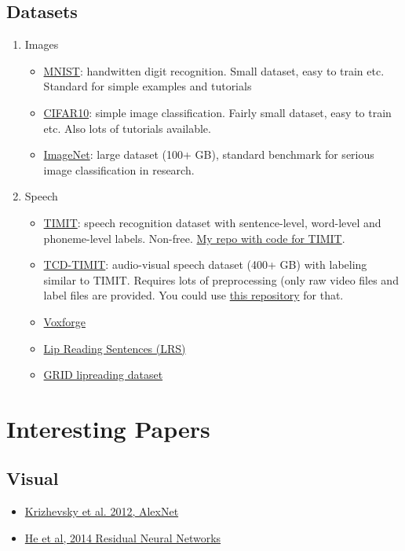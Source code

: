 \documentclass[]{article}
\begin{document}
\subsection{Datasets}
\begin{enumerate}
	\item{Images}
	\begin{itemize}
		\item \href{http://yann.lecun.com/exdb/mnist/}{MNIST}: handwitten digit recognition. Small dataset, easy to train etc. Standard for simple examples and tutorials
		\item \href{https://www.cs.toronto.edu/~kriz/cifar.html}{CIFAR10}: simple image classification. Fairly small dataset, easy to train etc. Also lots of tutorials available.
		\item \href{http://www.image-net.org/}{ImageNet}: large dataset (100+ GB), standard benchmark for serious image classification in research. 
	\end{itemize}
	\item{Speech}
	\begin{itemize}
		\item \href{https://catalog.ldc.upenn.edu/LDC93S1}{TIMIT}: speech recognition dataset with sentence-level, word-level and phoneme-level labels. Non-free. \href{https://github.com/matthijsvk/TIMITspeech}{My repo with code for TIMIT}.
		\item \href{https://sigmedia.tcd.ie/TCDTIMIT/}{TCD-TIMIT}: audio-visual speech dataset (400+ GB) with labeling similar to TIMIT. Requires lots of preprocessing (only raw video files and label files are provided. You could use \href{https://github.com/matthijsvk/TCDTIMITprocessing}{this repository} for that.
		\item \href{http://www.voxforge.org/}{Voxforge}
		\item \href{http://www.robots.ox.ac.uk/~vgg/data/lip_reading_sentences/}{Lip Reading Sentences (LRS)}
		\item \href{http://spandh.dcs.shef.ac.uk/gridcorpus/}{GRID lipreading dataset}
	\end{itemize}
\end{enumerate}

\pagebreak
\section{Interesting Papers}

\subsection{Visual}
\begin{itemize}
	\item \href{http://papers.nips.cc/paper/4824-imagenet-classification-with-deep-convolutional-neural-networks}{Krizhevsky et al. 2012, AlexNet}
	\item \href{https://www.cv-foundation.org/openaccess/content_cvpr_2016/html/He_Deep_Residual_Learning_CVPR_2016_paper.html}{He et al, 2014 Residual Neural Networks}
\end{itemize}
	
\end{document}
